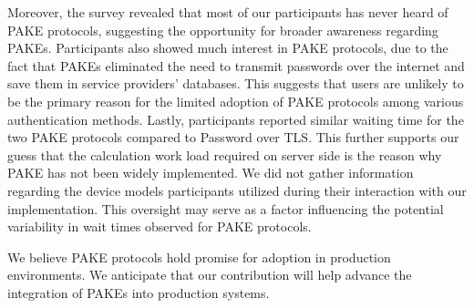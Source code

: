 Moreover, the survey revealed that most of our participants has never heard of PAKE protocols, suggesting the opportunity for broader awareness regarding PAKEs.
Participants also showed much interest in PAKE protocols, due to the fact that PAKEs eliminated the need to transmit passwords over the internet and save them in service providers' databases.
This suggests that users are unlikely to be the primary reason for the limited adoption of PAKE protocols among various authentication methods.
Lastly, participants reported similar waiting time for the two PAKE protocols compared to Password over TLS.
This further supports our guess that the calculation work load required on server side is the reason why PAKE has not been widely implemented. 
We did not gather information regarding the device models participants utilized during their interaction with our implementation.
This oversight may serve as a factor influencing the potential variability in wait times observed for PAKE protocols.

We believe PAKE protocols hold promise for adoption in production environments. 
We anticipate that our contribution will help advance the integration of PAKEs into production systems.




